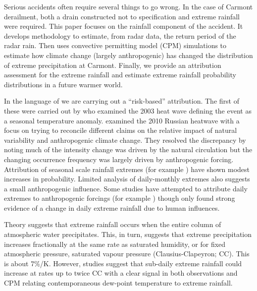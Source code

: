\documentclass[11pt,a4paper]{article}
\begin{document}
 Serious accidents often require several things to go wrong. In the case of Carmont derailment,   both a drain constructed not to specification and extreme rainfall were required. This paper focuses on the rainfall component of the accident. It develops methodology to estimate, from radar data, the return period of the radar rain. Then uses convective permitting model (CPM) simulations to estimate how climate change (largely anthropogenic) has changed the distribution of extreme precipitation at Carmont. Finally, we  provide an  attribution assessment for the extreme rainfall and estimate extreme rainfall probability distributions in a future warmer world. 
 
 
 In the language of \cite{Shepherd2016} we are carrying out a ``risk-based'' attribution.  The first of these were carried out by \cite{Stott_2004} who examined the 2003 heat wave defining the event as a seasonal temperature anomaly. \cite{Otto2012russian} examined the 2010 Russian heatwave with a focus on trying to reconcile different claims on the relative impact of natural variability and anthropogenic climate change. They resolved the discrepancy by noting much of the intensity change was driven by the natural circulation but the changing  occurrence frequency was largely driven by anthropogenic forcing. Attribution of seasonal scale rainfall extremes (for example \cite{li2018yangtze,christidis2022wetUK}) have shown modest increases in probability.  Limited analysis of daily-monthly  extremes \parencite{Pei2022precip,Kawase2022japan_rain,Kawase2020rain,tradowsky2023w_europe_rain} also suggests a small anthropogenic influence.  Some studies have attempted to attribute daily extremes to anthropogenic forcings (for example  \cite{Eden2018dutchrain,Tozer2020tas_rain,Li2022typhoon_rain,Zhang2020rainfall}) though only \cite{Li2022typhoon_rain,Zhang2020rainfall}  found strong evidence of a change in daily extreme rainfall due to human influences. 

Theory\parencite{allen02insight} suggests that extreme rainfall occurs when the entire column of atmospheric water precipitates. This, in turn,  suggests that extreme precipitation increases fractionally at the same rate as saturated humidity, or for fixed atmospheric pressure, saturated vapour pressure (Clausius-Clapeyron; CC). This is about 7\%/K. However,  studies suggest that sub-daily extreme rainfall  could increase  at rates  up to twice CC\parencite{fowler2021rainfall_extremes} with a clear signal in both observations and CPM relating contemporaneous dew-point temperature to extreme rainfall. 
 
\end{document}

